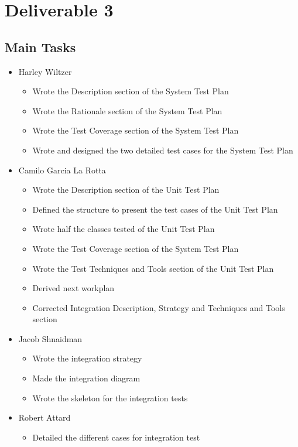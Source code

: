 \documentclass[12pt]{article}
\begin{document}
\newpage
 \section{Deliverable 3}
%
 \subsection{Main Tasks}
%
%
 \begin{itemize}
     \item Harley Wiltzer
 	\begin{itemize}
 		\item Wrote the Description section of the System Test Plan
		\item Wrote the Rationale section of the System Test Plan
		\item Wrote the Test Coverage section of the System Test Plan
		\item Wrote and designed the two detailed test cases for the System Test Plan
 	\end{itemize}
     \item Camilo Garcia La Rotta
     \begin{itemize}
        \item Wrote the Description section of the Unit Test Plan
		\item Defined the structure to present the test cases of the Unit Test Plan
		\item Wrote half the classes tested of the Unit Test Plan
		\item Wrote the Test Coverage section of the System Test Plan
		\item Wrote the Test Techniques and Tools section of the Unit Test Plan
		\item Derived next workplan
		\item Corrected Integration Description, Strategy and Techniques and Tools section
     \end{itemize}
     \item Jacob Shnaidman
 		\begin{itemize}
 			\item Wrote the integration strategy
			\item Made the integration diagram
			\item Wrote the skeleton for the integration tests
 		\end{itemize}
     \item Robert Attard
     \begin{itemize}
         \item Detailed the different cases for integration test

\end{itemize}
\end{itemize}
\end{document}
